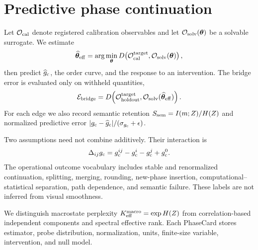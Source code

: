\section{Predictive phase continuation}

Let $\mathcal O_{\rm cal}$ denote registered calibration observables and let
$\mathcal O_{\rm solv}(\bm\theta)$ be a solvable surrogate.  We estimate
\begin{equation}
 \widehat{\bm\theta}_{\rm eff}=\arg\min_{\bm\theta}
 D\!\left(\mathcal O_{\rm cal}^{\rm target},
 \mathcal O_{\rm solv}(\bm\theta)\right),
\end{equation}
then predict $\widehat g_{\mathrm c}$, the order curve, and the response to an intervention.
The bridge error is evaluated only on withheld quantities,
\begin{equation}
 \mathcal E_{\mathrm{bridge}}=D\!\left(\mathcal O_{\rm holdout}^{\rm target},
 \mathcal O_{\rm solv}(\widehat{\bm\theta}_{\rm eff})\right).
\end{equation}
For each edge we also record semantic retention
$S_{\rm sem}=I(m;Z)/H(Z)$ and normalized predictive error
$|g_{\mathrm c}-\widehat g_{\mathrm c}|/(\sigma_{g_{\mathrm c}}+\epsilon)$.

Two assumptions need not combine additively.  Their interaction is
\begin{equation}
 \Delta_{ij}g_{\mathrm c}=g_{\mathrm c}^{ij}-g_{\mathrm c}^i-g_{\mathrm c}^j+g_{\mathrm c}^0.
\end{equation}
The operational outcome vocabulary includes stable and renormalized
continuation, splitting, merging, rounding, new-phase insertion,
computational--statistical separation, path dependence, and semantic failure.
These labels are not inferred from visual smoothness.

We distinguish macrostate perplexity $K_{\rm eff}^{\rm macro}=\exp H(Z)$ from
correlation-based independent components and spectral effective rank.  Each
PhaseCard stores estimator, probe distribution, normalization, units,
finite-size variable, intervention, and null model.
